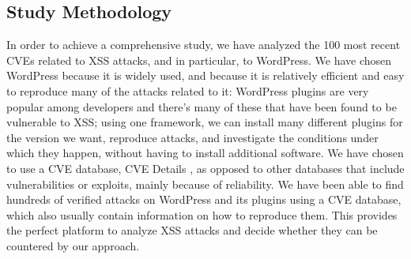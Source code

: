 \subsection{Study Methodology}
In order to achieve a comprehensive study, we have analyzed the 100 most recent CVEs related to XSS attacks, and in particular, to WordPress. We have chosen WordPress because it is widely used, and because it is relatively efficient and easy to reproduce many of the attacks related to it: WordPress plugins are very popular among developers and there's many of these that have been found to be vulnerable to XSS; using one framework, we can install many different plugins for the version we want, reproduce attacks, and investigate the conditions under which they happen, without having to install additional software. We have chosen to use a CVE database, CVE Details \cite{cvedetails}, as opposed to other databases that include vulnerabilities or exploits, mainly because of reliability. We have been able to find hundreds of verified attacks on WordPress and its plugins using a CVE database, which also usually contain information on how to reproduce them. This provides the perfect platform to analyze XSS attacks and decide whether they can be countered by our approach. 

